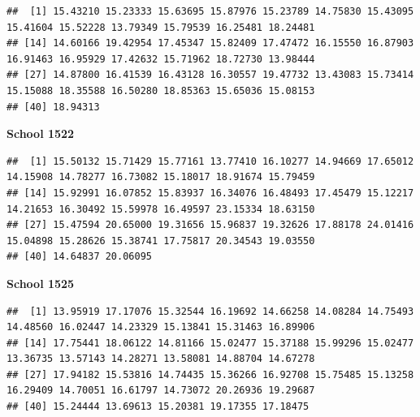 \documentclass[
  12pt,
]{book}
\newenvironment{Shaded}{\begin{snugshade}}{\end{snugshade}}
\newcommand{\AttributeTok}[1]{\textcolor[rgb]{0.77,0.63,0.00}{#1}}
\newcommand{\DecValTok}[1]{\textcolor[rgb]{0.00,0.00,0.81}{#1}}
\newcommand{\FunctionTok}[1]{\textcolor[rgb]{0.00,0.00,0.00}{#1}}
\newcommand{\NormalTok}[1]{#1}
\newcommand{\SpecialCharTok}[1]{\textcolor[rgb]{0.00,0.00,0.00}{#1}}
\begin{document}
\begin{verbatim}
##  [1] 15.43210 15.23333 15.63695 15.87976 15.23789 14.75830 15.43095 15.41604 15.52228 13.79349 15.79539 16.25481 18.24481
## [14] 14.60166 19.42954 17.45347 15.82409 17.47472 16.15550 16.87903 16.91463 16.95929 17.42632 15.71962 18.72730 13.98444
## [27] 14.87800 16.41539 16.43128 16.30557 19.47732 13.43083 15.73414 15.15088 18.35588 16.50280 18.85363 15.65036 15.08153
## [40] 18.94313
\end{verbatim}

\textbf{School 1522}

\begin{Shaded}
\end{Shaded}

\begin{verbatim}
##  [1] 15.50132 15.71429 15.77161 13.77410 16.10277 14.94669 17.65012 14.15908 14.78277 16.73082 15.18017 18.91674 15.79459
## [14] 15.92991 16.07852 15.83937 16.34076 16.48493 17.45479 15.12217 14.21653 16.30492 15.59978 16.49597 23.15334 18.63150
## [27] 15.47594 20.65000 19.31656 15.96837 19.32626 17.88178 24.01416 15.04898 15.28626 15.38741 17.75817 20.34543 19.03550
## [40] 14.64837 20.06095
\end{verbatim}

\textbf{School 1525}

\begin{Shaded}
\end{Shaded}

\begin{verbatim}
##  [1] 13.95919 17.17076 15.32544 16.19692 14.66258 14.08284 14.75493 14.48560 16.02447 14.23329 15.13841 15.31463 16.89906
## [14] 17.75441 18.06122 14.81166 15.02477 15.37188 15.99296 15.02477 13.36735 13.57143 14.28271 13.58081 14.88704 14.67278
## [27] 17.94182 15.53816 14.74435 15.36266 16.92708 15.75485 15.13258 16.29409 14.70051 16.61797 14.73072 20.26936 19.29687
## [40] 15.24444 13.69613 15.20381 19.17355 17.18475
\end{verbatim}
\end{document}
